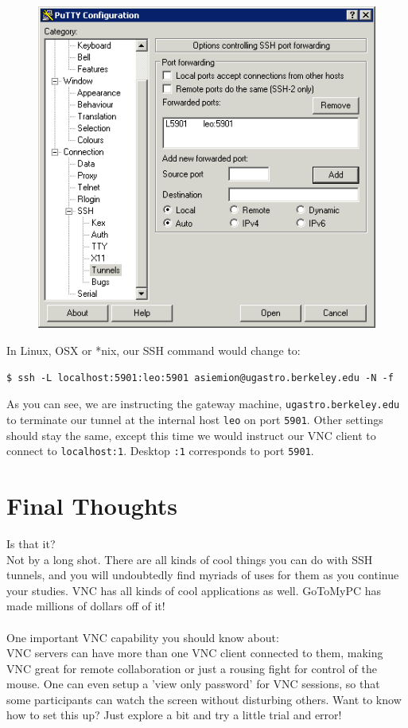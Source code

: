 \documentclass[11pt,preprint]{aastex}
\begin{document}
\begin{figure}[h!]
\begin{center}
\includegraphics[scale=0.6]{putty3.png}
\end{center}
\end{figure}

\noindent In Linux, OSX or *nix, our SSH command would change to:
\begin{verbatim}
$ ssh -L localhost:5901:leo:5901 asiemion@ugastro.berkeley.edu -N -f
\end{verbatim}

As you can see, we are instructing the gateway machine, \verb$ugastro.berkeley.edu$ to terminate our tunnel at the internal host \verb$leo$ on port \verb$5901$.  Other settings should stay the same, 
except this time we would instruct our VNC client to connect to \verb$localhost:1$.  Desktop \verb$:1$ corresponds to port \verb$5901$.

\section{Final Thoughts}
\noindent Is that it?
\\
Not by a long shot.  There are all kinds of cool things you can do with SSH tunnels, and you will undoubtedly find myriads of uses for them as you continue your studies.  VNC has all kinds of cool applications as well.  GoToMyPC has made millions of dollars off of it!
\\
\\
One important VNC capability you should know about:
\\
VNC servers can have more than one VNC client connected to them, making VNC great for remote collaboration or just a rousing fight for control of the mouse. One can even setup a 'view only password' for VNC sessions, so that some participants can watch the screen without disturbing others.  Want to know how to set this up?  Just explore a bit and try a little trial and error!
\end{document}
